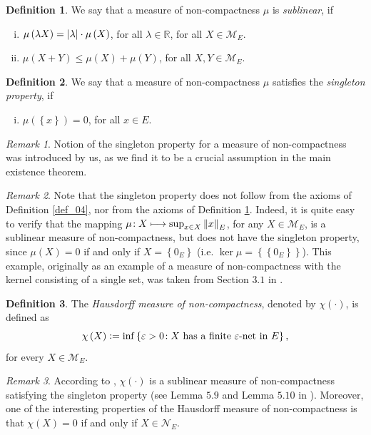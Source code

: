 \documentclass[reqno]{amsart}
\numberwithin{equation}{section}
\theoremstyle{definition}
\newtheorem{definition}{Definition}
\theoremstyle{remark}
\newtheorem{remark}{Remark}
\newcommand{\br}[1]{\left(#1\right)}
\newcommand{\cbr}[1]{\left\{#1\right\}}
\newcommand{\definitionRef}[1]{\textrm{Definition \ref{#1}}}
\newcommand{\defeq}{\vcentcolon=}
\newcommand{\eps}{\varepsilon}
\newcommand{\fM}{\mathcal{M}}
\newcommand{\fN}{\mathcal{N}}
\newcommand{\R}{\mathbb{R}}
\newcommand{\st}{\!:}
\begin{document}
	\begin{definition}\label{def_05}
		We say that a measure of non-compactness $\mu$ is \textit{sublinear}, if
		\begin{enumerate}[(i)]\addtocounter{enumi}{6}
			\item $\mu\br{\lambda{X}}=\abs{\lambda}\cdot\mu\br{X}$, for all $\lambda\in\R$, for all $X\in\fM_E$.
			\item $\mu\br{X+Y}\leq\mu\br{X}+\mu\br{Y}$, for all $X,Y\in\fM_E$.
		\end{enumerate}
	\end{definition}
	\begin{definition}\label{def_06}
		We say that a measure of non-compactness $\mu$ satisfies the \textit{singleton property}, if
		\begin{enumerate}[(i)]\addtocounter{enumi}{8}
			\item $\mu\br{\cbr{x}}=0$, for all $x\in{E}$.
		\end{enumerate}
	\end{definition}
	\begin{remark}
		Notion of the singleton property for a measure of non-compactness was introduced by us, as we find it to be a crucial assumption in the main existence theorem.
	\end{remark}
	\begin{remark}\label{rem_09}
		Note that the singleton property does not follow from the axioms of \definitionRef{def_04}, nor from the axioms of \definitionRef{def_05}. Indeed, it is quite easy to verify that the mapping $\mu\st{X}\longmapsto\sup_{x\in{X}}\norm{x}_E$, for any $X\in\fM_E$, is a sublinear measure of non-compactness, but does not have the singleton property, since $\mu\br{X}=0$ if and only if $X=\cbr{0_E}$ (i.e. $\ker\mu=\cbr{\cbr{0_E}}$). This example, originally as an example of a measure of non-compactness with the kernel consisting of a single set, was taken from Section $3.1$ in \cite{Banas_book}.
	\end{remark}
	\begin{definition}
		The \textit{Hausdorff measure of non-compactness}, denoted by $\chi\br{\cdot}$, is defined as
		\begin{equation}\label{eq_02_20}
			\chi\br{X}\defeq\inf\cbr{\eps>0\st{X}\text{ has a finite $\eps$-net in }E},
		\end{equation}
		for every $X\in\fM_E$.
	\end{definition}
	\begin{remark}\label{rem_10}
		According to \cite{Banas_book_sequences}, $\chi\br{\cdot}$ is a sublinear measure of non-compactness satisfying the singleton property (see Lemma $5.9$ and Lemma $5.10$ in \cite{Banas_book_sequences}). Moreover, one of the interesting properties of the Hausdorff measure of non-compactness is that $\chi\br{X}=0$ if and only if $X\in\fN_E$.
	\end{remark}
\end{document}
